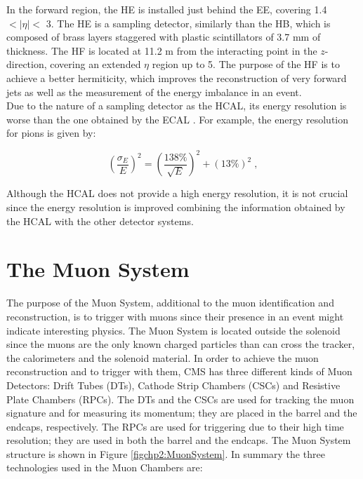 \noindent In the forward region, the HE is installed just behind the EE, covering 
1.4 $ < |\eta| <$ 3. The HE is a sampling detector, similarly than the HB, which 
is composed of brass layers staggered with plastic scintillators of 3.7 mm of 
thickness. The HF is located at 11.2 m from the interacting point in the $z$-direction,
covering an extended $\eta$ region up to 5. The purpose of 
the HF is to achieve a better hermiticity, which improves 
the reconstruction of very forward jets as well as 
the measurement of the energy imbalance in an event. \\

\noindent Due to the nature of a sampling detector as the HCAL, its energy resolution 
is worse than the one obtained by the ECAL \cite{chp2:CMS}. For example, the energy
resolution for pions is given by:

\begin{equation} \label{ECALenergyResolution}
 \left(\frac{\sigma_{E}}{E}\right)^{2} = \left(\frac{138\%}{\sqrt{E}}\right)^{2} + \left(13\% \right)^{2} \;, 
\end{equation}

\noindent Although the HCAL does not provide a high energy resolution, it is not crucial
since the energy resolution is improved combining the information obtained by the HCAL
with the other detector systems. 

\section{The Muon System}
\label{sec:MuonSys}

\noindent The purpose of the Muon System, additional to the muon identification and reconstruction, is
to trigger with muons since their presence in an event might indicate interesting physics. The Muon System
is located outside the solenoid since the muons are the only known charged particles 
than can cross the tracker, the calorimeters and the solenoid material. In order to achieve the
muon reconstruction and to trigger with them, CMS has three different kinds of 
Muon Detectors: Drift Tubes (DTs), Cathode Strip Chambers (CSCs) and Resistive 
Plate Chambers (RPCs). The DTs and the CSCs are used for tracking the muon 
signature and for measuring its momentum; they are placed in the barrel and 
the endcaps, respectively. The RPCs are used for triggering due to their high time 
resolution; they are used in both the barrel and the endcaps. The Muon System structure is 
shown in Figure \ref{figchp2:MuonSystem}. In summary the three technologies used in the Muon Chambers are:

